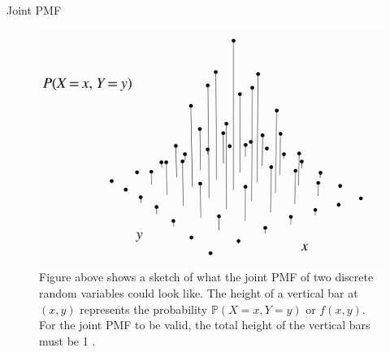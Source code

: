 \documentclass[8pt, usepdftitle=false]{beamer}
\begin{document}
\begin{frame}{Joint PMF}
\begin{figure}
  \includegraphics[scale = .25]{Images/joint_PMF.png}
  \caption{Figure above shows a sketch of what the joint PMF of two discrete random variables could look like. The height of a vertical bar at $(x, y)$ represents the probability $\mathbb{P}(X=x, Y=y)$ or $f(x, y)$. For the joint PMF to be valid, the total height of the vertical bars must be 1 .}
\end{figure}




\end{frame}
\end{document}

